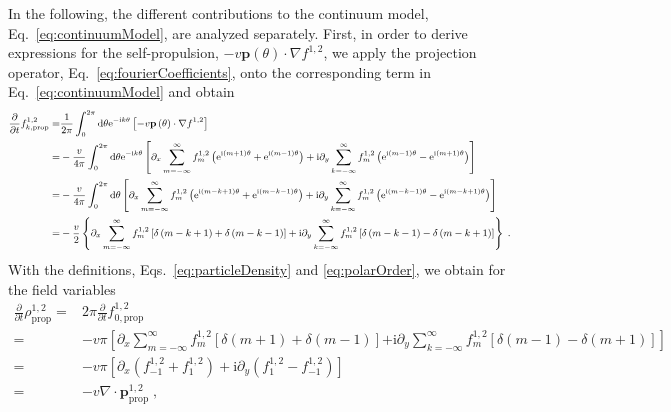 \documentclass{article}
\begin{document}
In the following, the different contributions to the continuum model, Eq.~\eqref{eq:continuumModel}, are analyzed separately.
First, in order to derive expressions for the self-propulsion, $-v\mathbf{p}\left( \theta \right) \cdot \nabla f^{1,2}$, we apply the projection operator, Eq.~\eqref{eq:fourierCoefficients}, onto the corresponding term in Eq.~\eqref{eq:continuumModel} and obtain
\begin{equation}
    \small
    \begin{aligned}
        \frac{\partial}{\partial t}f_{k,\mathrm{prop}}^{1,2}=&\frac{1}{2\pi}\int_0^{2\pi}{\mathrm{d}\theta \mathrm{e}^{-\mathrm{i}k\theta}\left[ -v\mathbf{p}\left( \theta \right) \cdot \nabla f^{1,2} \right]}\\
        =&-\frac{v}{4\pi}\int_0^{2\pi}{\mathrm{d}\theta \mathrm{e}^{-\mathrm{i}k\theta}\left[ \partial _x\sum_{m=-\infty}^{\infty}{f_{m}^{1,2}\left( \mathrm{e}^{\mathrm{i}\left( m+1 \right) \theta}+\mathrm{e}^{\mathrm{i}\left( m-1 \right) \theta} \right)}+\mathrm{i}\partial _y\sum_{k=-\infty}^{\infty}{f_{m}^{1,2}\left( \mathrm{e}^{\mathrm{i}\left( m-1 \right) \theta}-\mathrm{e}^{\mathrm{i}\left( m+1 \right) \theta} \right)} \right]}\\
        =&-\frac{v}{4\pi}\int_0^{2\pi}{\mathrm{d}\theta \left[ \partial _x\sum_{m=-\infty}^{\infty}{f_{m}^{1,2}\left( \mathrm{e}^{\mathrm{i}\left( m-k+1 \right) \theta}+\mathrm{e}^{\mathrm{i}\left( m-k-1 \right) \theta} \right)}+\mathrm{i}\partial _y\sum_{k=-\infty}^{\infty}{f_{m}^{1,2}\left( \mathrm{e}^{\mathrm{i}\left( m-k-1 \right) \theta}-\mathrm{e}^{\mathrm{i}\left( m-k+1 \right) \theta} \right)} \right]}\\
        =&-\frac{v}{2}\left\{ \partial _x\sum_{m=-\infty}^{\infty}{f_{m}^{1,2}\left[ \delta \left( m-k+1 \right) +\delta \left( m-k-1 \right) \right] +\mathrm{i}\partial _y\sum_{k=-\infty}^{\infty}{f_{m}^{1,2}\left[ \delta \left( m-k-1 \right) -\delta \left( m-k+1 \right) \right]}} \right\} \;.\\
    \end{aligned}
\end{equation}
With the definitions, Eqs.~\eqref{eq:particleDensity} and \eqref{eq:polarOrder}, we obtain for the field variables
\begin{equation}
    \begin{aligned}
        \frac{\partial}{\partial t}\rho _{\mathrm{prop}}^{1,2}=&2\pi \frac{\partial}{\partial t}f_{0,\mathrm{prop}}^{1,2}\\
        =&-v\pi \left[ \partial _x\sum_{m=-\infty}^{\infty}{f_{m}^{1,2}}\left[ \delta \left( m+1 \right) +\delta \left( m-1 \right) \right] \right.\left. +\mathrm{i}\partial _y\sum_{k=-\infty}^{\infty}{f_{m}^{1,2}}\left[ \delta \left( m-1 \right) -\delta \left( m+1 \right) \right] \right]\\
        =&-v\pi \left[ \partial _x\left( f_{-1}^{1,2}+f_{1}^{1,2} \right) +\mathrm{i}\partial _y\left( f_{1}^{1,2}-f_{-1}^{1,2} \right) \right]\\
        =&-v\nabla \cdot \boldsymbol{p}_{\mathrm{prop}}^{1,2}\;,\\
    \end{aligned}
\end{equation}
\end{document}
